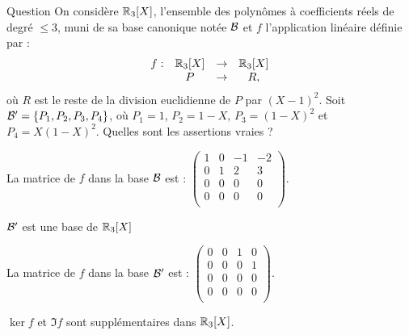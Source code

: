 \begin{multi}[multiple,feedback=
{La matrice de \(f\)  d'une base \( {\cal {B}}=(u_j)\) dans une autre base \( {\cal {B}}'=(v_i)\) est la matrice  dont la \(j\)ième colonne est constituée des coordonnées de  \(f(u_j)\) dans la base \( {\cal {B}}'\).
\vskip0mm
La matrice de \(f\) dans la base \({\cal {B}}\) est : \(\left(\begin{array}{rccc}
1&0&-1&-2\\
0&1&2&3\\ 
0&0&0&0\\
0&0&0&0\\
\end{array}\right)\).
\vskip0mm
La matrice de \(f\) de la base \( {\cal {B'}}\) est : \(
\left(\begin{array}{rccc}
1&0&0&0\\
0&1&0&0\\ 
0&0&0&0\\
0&0&0&0\\
\end{array}\right).\)
\vskip0mm
De cette matrice, on déduit que \(\{P_1,P_2\}\) est une base de \(\Im f\) et \(\{P_3,P_4\}\) est une base de \(\ker f\). Comme \(\{P_1,P_2,P_3,P_4\}\) est une base de \(\Rr_3[X]\), \(\Im f\) et \(\ker f\) sont  supplémentaires dans  \(\Rr_3[X]\).
}]{Question}
On considère \(\Rr_3[X]\), l'ensemble des polynômes à coefficients réels de degré \(\le 3\), muni de sa base canonique notée \({\cal {B}}\) et \(f\) l'application linéaire définie par : 
\[\begin{array}{rccc}f:&\mathbb{R}_3[X] &\to& \mathbb{R}_3[X]\\
& P&\to &R, \end{array}\]
où \(R\) est le reste de la division euclidienne de \(P\) par \((X-1)^2\). Soit \({\cal {B'}} =\{P_1,P_2,P_3,P_4\}\), où \(P_1=1\), \(P_2=1-X\), \(P_3=(1-X)^2\) et \(P_4=X(1-X)^2\). Quelles sont les assertions vraies ?

    \item* La matrice de \(f\) dans la base \( {\cal {B}}\) est : \(\left(\begin{array}{rccc}
1&0&-1&-2\\
0&1&2&3\\
0&0&0&0\\
0&0&0&0\\
\end{array}\right)\).
    \item* \({\cal {B'}} \)  est une base de \(\Rr_3[X]\)
    \item La matrice de \(f\) dans la base \( {\cal {B'}}\) est : \(\left(\begin{array}{rccc}
0&0&1&0\\
0&0&0&1\\
0&0&0&0\\
0&0&0&0\\
\end{array}\right)\).
    \item* \(\ker f\) et \(\Im f\) sont supplémentaires dans  \(\Rr_3[X]\).
\end{multi}


